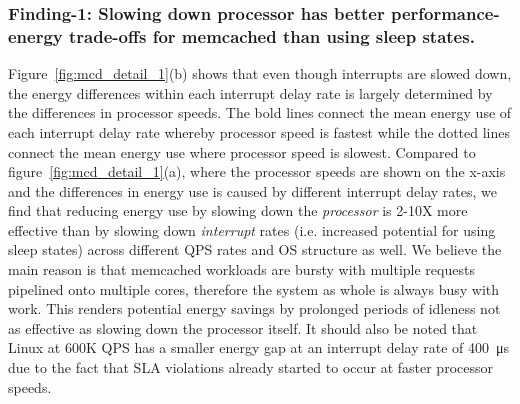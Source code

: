 
\subsubsection{Finding-1: Slowing down processor has better performance-energy trade-offs for memcached than using sleep states.} \label{sec:f1} Figure~\ref{fig:mcd_detail_1}(b) shows that even though interrupts are slowed down, the energy differences within each interrupt delay rate is largely determined by the differences in processor speeds. The bold lines connect the mean energy use of each interrupt delay rate whereby processor speed is fastest while the dotted lines connect the mean energy use where processor speed is slowest. Compared to figure~\ref{fig:mcd_detail_1}(a), where the processor speeds are shown on the x-axis and the differences in energy use is caused by different interrupt delay rates, we find that reducing energy use by slowing down the \textit{processor} is 2-10X more effective than by slowing down \textit{interrupt} rates (i.e. increased potential for using sleep states) across different QPS rates and OS structure as well. We believe the main reason is that memcached workloads are bursty with multiple requests pipelined onto multiple cores, therefore the system as whole is always busy with work. This renders potential energy savings by prolonged periods of idleness not as effective as slowing down the processor itself. It should also be noted that Linux at 600K QPS has a smaller energy gap at an interrupt delay rate of \SI{400}{\micro s} due to the fact that SLA violations already started to occur at faster processor speeds.


